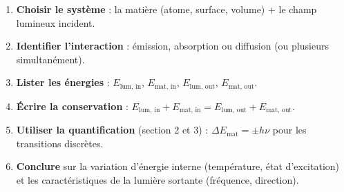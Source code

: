 \documentclass[11pt]{article}
\begin{document}
\begin{methode}
\begin{enumerate}
\item \textbf{Choisir le système} : la matière (atome, surface, volume) + le champ lumineux incident.
\item \textbf{Identifier l'interaction} : émission, absorption ou diffusion (ou plusieurs simultanément).
\item \textbf{Lister les énergies} : $E_{\text{lum, in}}$, $E_{\text{mat, in}}$, $E_{\text{lum, out}}$, $E_{\text{mat, out}}$.
\item \textbf{Écrire la conservation} : $E_{\text{lum, in}} + E_{\text{mat, in}} = E_{\text{lum, out}} + E_{\text{mat, out}}$.
\item \textbf{Utiliser la quantification} (section 2 et 3) : $\Delta E_{\text{mat}} = \pm h\nu$ pour les transitions discrètes.
\item \textbf{Conclure} sur la variation d'énergie interne (température, état d'excitation) et les caractéristiques de la lumière sortante (fréquence, direction).
\end{enumerate}
\end{methode}
\end{document}
